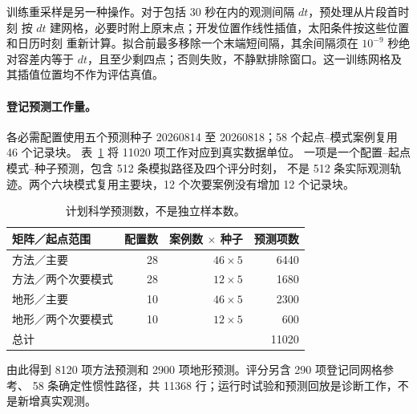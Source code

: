 \documentclass[UTF8,11pt]{ctexart}
\begin{document}
训练重采样是另一种操作。对于包括 30 秒在内的观测间隔 \(dt\)，预处理从片段首时刻
按 \(dt\) 建网格，必要时附上原末点；开发位置作线性插值，太阳条件按这些位置和日历时刻
重新计算。拟合前最多移除一个末端短间隔，其余间隔须在 \(10^{-9}\) 秒绝对容差内等于
\(dt\)，且至少剩四点；否则失败，不静默排除窗口。这一训练网格及其插值位置均不作为评估真值。

\paragraph{登记预测工作量。}\label{sec:forecast-inventory}
各必需配置使用五个预测种子 20260814 至 20260818；58 个起点--模式案例复用 46 个记录块。
表~\ref{tab:forecast-counts} 将 11020 项工作对应到真实数据单位。
一项是一个配置--起点模式--种子预测，包含 512 条模拟路径及四个评分时刻，
不是 512 条实际观测轨迹。两个六块模式复用主要块，12 个次要案例没有增加 12 个记录块。
\begin{table}[htbp]
\centering\small
\caption{计划科学预测数，不是独立样本数。}
\label{tab:forecast-counts}
\begin{tabular}{@{}lrrr@{}}
\toprule
矩阵／起点范围 & 配置数 & 案例数 $\times$ 种子 & 预测项数\\
\midrule
方法／主要 & 28 & $46\times5$ & 6440\\
方法／两个次要模式 & 28 & $12\times5$ & 1680\\
地形／主要 & 10 & $46\times5$ & 2300\\
地形／两个次要模式 & 10 & $12\times5$ & 600\\
\midrule
总计 & & & 11020\\
\bottomrule
\end{tabular}
\end{table}
由此得到 8120 项方法预测和 2900 项地形预测。评分另含 290 项登记同网格参考、
58 条确定性惯性路径，共 11368 行；运行时试验和预测回放是诊断工作，不是新增真实观测。
\end{document}
